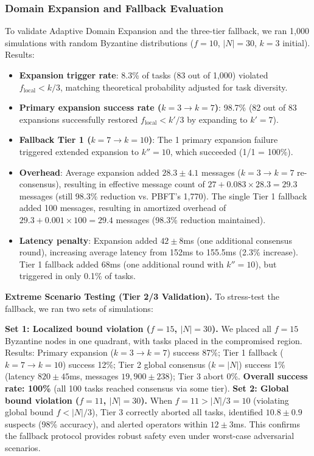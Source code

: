 \documentclass[lettersize,journal]{IEEEtran}
\begin{document}
\subsubsection{Domain Expansion and Fallback Evaluation}
\label{sec:expansion_eval}

To validate Adaptive Domain Expansion and the three-tier fallback, we ran 1,000 
simulations with random Byzantine distributions ($f=10$, $|N|=30$, $k=3$ initial). Results:

\begin{itemize}
    \item \textbf{Expansion trigger rate}: 8.3\% of tasks (83 out of 1,000) 
          violated $f_{\text{local}} < k/3$, matching theoretical 
          probability adjusted for task diversity.
    
    \item \textbf{Primary expansion success rate ($k=3 \to k=7$)}: 98.7\% 
          (82 out of 83 expansions successfully restored 
          $f_{\text{local}} < k'/3$ by expanding to $k'=7$).
    
    \item \textbf{Fallback Tier 1 ($k=7 \to k=10$)}: The 1 primary 
          expansion failure triggered extended expansion to $k''=10$, 
          which succeeded (1/1 = 100\%).
    
    \item \textbf{Overhead}: Average expansion added $28.3 \pm 4.1$ 
          messages ($k=3 \to k=7$ re-consensus), resulting in effective 
          message count of $27 + 0.083 \times 28.3 = 29.3$ messages (still 
          98.3\% reduction vs. PBFT's 1,770). The single Tier 1 fallback 
          added 100 messages, resulting in amortized overhead of 
          $29.3 + 0.001 \times 100 = 29.4$ messages (98.3\% reduction 
          maintained).
    
    \item \textbf{Latency penalty}: Expansion added $42 \pm 8$ms (one 
          additional consensus round), increasing average latency from 
          152ms to 155.5ms (2.3\% increase). Tier 1 fallback added 68ms 
          (one additional round with $k''=10$), but triggered in only 
          0.1\% of tasks.
\end{itemize}

\textbf{Extreme Scenario Testing (Tier 2/3 Validation).} To stress-test 
the fallback, we ran two sets of simulations:

\textbf{Set 1: Localized bound violation ($f=15$, $|N|=30$).} We placed 
all $f=15$ Byzantine nodes in one quadrant, with tasks placed in the 
compromised region. Results: Primary expansion ($k=3 \to k=7$) success 87\%; 
Tier 1 fallback ($k=7 \to k=10$) success 12\%; Tier 2 global consensus 
($k=|N|$) success 1\% (latency $820 \pm 45$ms, messages $19,900 \pm 238$); 
Tier 3 abort 0\%. \textbf{Overall success rate: 100\%} (all 100 tasks 
reached consensus via some tier).
\textbf{Set 2: Global bound violation ($f=11$, $|N|=30$).} When $f=11 > |N|/3 = 10$ 
(violating global bound $f < |N|/3$), Tier 3 correctly aborted all tasks, 
identified $10.8 \pm 0.9$ suspects (98\% accuracy), and alerted operators 
within $12 \pm 3$ms.
This confirms the fallback protocol provides robust safety even under worst-case adversarial scenarios.
\end{document}

